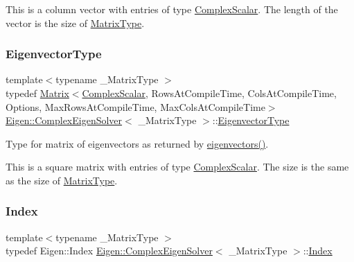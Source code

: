 This is a column vector with entries of type \mbox{\hyperlink{class_eigen_1_1_complex_eigen_solver_a3604c99a69fac3bee42c88cb2b589143}{Complex\+Scalar}}. The length of the vector is the size of \mbox{\hyperlink{class_eigen_1_1_complex_eigen_solver_ad61f6278843a601096276c9a72c0252f}{Matrix\+Type}}. \mbox{\label{class_eigen_1_1_complex_eigen_solver_a67cd4d20590abfd86b2639c4c8ea3dd6}} 
\subsubsection{\texorpdfstring{EigenvectorType}{EigenvectorType}}
{\footnotesize\ttfamily template$<$typename \+\_\+\+Matrix\+Type $>$ \\
typedef \mbox{\hyperlink{class_eigen_1_1_matrix}{Matrix}}$<$\mbox{\hyperlink{class_eigen_1_1_complex_eigen_solver_a3604c99a69fac3bee42c88cb2b589143}{Complex\+Scalar}}, Rows\+At\+Compile\+Time, Cols\+At\+Compile\+Time, Options, Max\+Rows\+At\+Compile\+Time, Max\+Cols\+At\+Compile\+Time$>$ \mbox{\hyperlink{class_eigen_1_1_complex_eigen_solver}{Eigen\+::\+Complex\+Eigen\+Solver}}$<$ \+\_\+\+Matrix\+Type $>$\+::\mbox{\hyperlink{class_eigen_1_1_complex_eigen_solver_a67cd4d20590abfd86b2639c4c8ea3dd6}{Eigenvector\+Type}}}



Type for matrix of eigenvectors as returned by \mbox{\hyperlink{class_eigen_1_1_complex_eigen_solver_a3aa5e27800349990778da8fa532c1270}{eigenvectors()}}. 

This is a square matrix with entries of type \mbox{\hyperlink{class_eigen_1_1_complex_eigen_solver_a3604c99a69fac3bee42c88cb2b589143}{Complex\+Scalar}}. The size is the same as the size of \mbox{\hyperlink{class_eigen_1_1_complex_eigen_solver_ad61f6278843a601096276c9a72c0252f}{Matrix\+Type}}. \mbox{\label{class_eigen_1_1_complex_eigen_solver_abc0218d8b902af0d6c759bfc0a8a8d74}} 
\subsubsection{\texorpdfstring{Index}{Index}}
{\footnotesize\ttfamily template$<$typename \+\_\+\+Matrix\+Type $>$ \\
typedef Eigen\+::\+Index \mbox{\hyperlink{class_eigen_1_1_complex_eigen_solver}{Eigen\+::\+Complex\+Eigen\+Solver}}$<$ \+\_\+\+Matrix\+Type $>$\+::\mbox{\hyperlink{class_eigen_1_1_complex_eigen_solver_abc0218d8b902af0d6c759bfc0a8a8d74}{Index}}}

